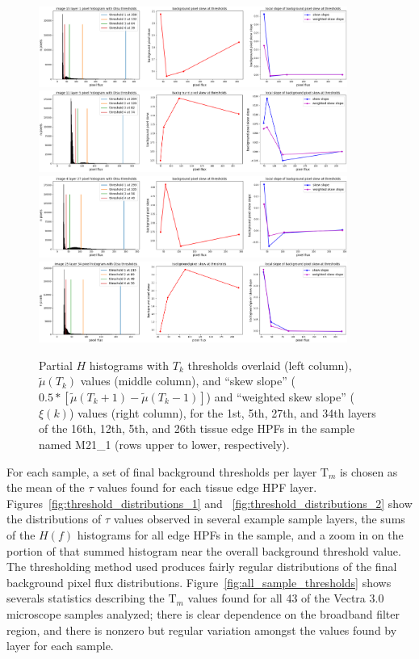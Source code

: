 \documentclass[letterpaper,11pt]{article}
\newcommand{\reffig}[1]{Figure~\ref{#1}}
\newcommand{\Tau}{\mathrm{T}}
\begin{document}
\begin{figure}[!ht]
\centering
\includegraphics[width=0.9\textwidth]{images/masking/thresholds_image_15_layer_1}
\includegraphics[width=0.9\textwidth]{images/masking/thresholds_image_11_layer_5}
\includegraphics[width=0.9\textwidth]{images/masking/thresholds_image_4_layer_27}
\includegraphics[width=0.9\textwidth]{images/masking/thresholds_image_25_layer_34}
\caption{\footnotesize Partial $H$ histograms with $T_{k}$ thresholds overlaid (left column), $\widetilde{\mu}(T_{k})$ values (middle column), and ``skew slope'' ($0.5*\left[\widetilde{\mu}(T_{k}+1) - \widetilde{\mu}(T_{k}-1)\right]$) and ``weighted skew slope'' ($\xi(k)$) values (right column), for the 1st, 5th, 27th, and 34th layers of the 16th, 12th, 5th, and 26th tissue edge HPFs in the sample named M21\_1 (rows upper to lower, respectively).}
\label{fig:histograms_with_otsu_thresholds}
\end{figure}

For each sample, a set of final background thresholds per layer $\Tau_{m}$ is chosen as the mean of the $\tau$ values found for each tissue edge HPF layer. Figures~\ref{fig:threshold_distributions_1} and ~\ref{fig:threshold_distributions_2} show the distributions of $\tau$ values observed in several example sample layers, the sums of the $H(f)$ histograms for all edge HPFs in the sample, and a zoom in on the portion of that summed histogram near the overall background threshold value. The thresholding method used produces fairly regular distributions of the final background pixel flux distributions. \reffig{fig:all_sample_thresholds} shows severals statistics describing the $\Tau_{m}$ values found for all 43 of the Vectra 3.0 microscope samples analyzed; there is clear dependence on the broadband filter region, and there is nonzero but regular variation amongst the values found by layer for each sample.
\end{document}
